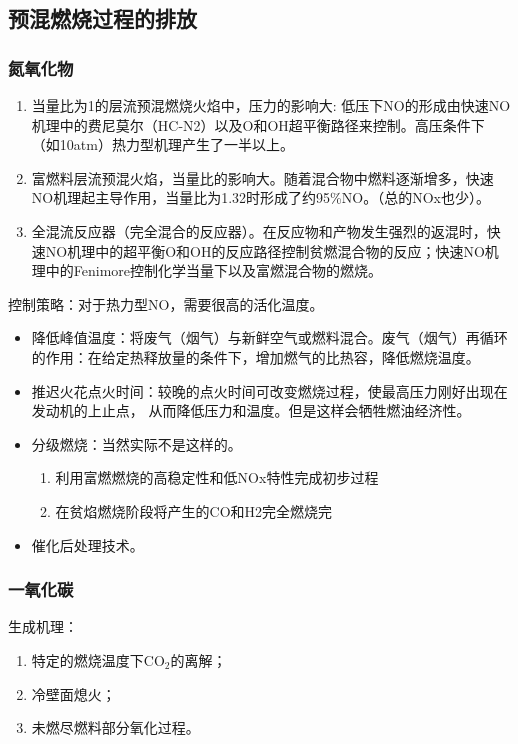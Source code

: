 \subsection{预混燃烧过程的排放}

\subsubsection{氮氧化物}

\begin{enumerate}
    \item 当量比为1的层流预混燃烧火焰中，压力的影响大: 低压下NO的形成由快速NO机理中的费尼莫尔（HC-N2）以及O和OH超平衡路径来控制。高压条件下（如10atm）热力型机理产生了一半以上。
    \item 富燃料层流预混火焰，当量比的影响大。随着混合物中燃料逐渐增多，快速NO机理起主导作用，当量比为1.32时形成了约95\%NO。（总的NOx也少）。
    \item 全混流反应器（完全混合的反应器）。在反应物和产物发生强烈的返混时，快速NO机理中的超平衡O和OH的反应路径控制贫燃混合物的反应；快速NO机理中的Fenimore控制化学当量下以及富燃混合物的燃烧。
\end{enumerate}

控制策略：对于热力型NO，需要很高的活化温度。
\begin{itemize}
    \item 降低峰值温度：将废气（烟气）与新鲜空气或燃料混合。废气（烟气）再循环的作用：在给定热释放量的条件下，增加燃气的比热容，降低燃烧温度。
    \item 推迟火花点火时间：较晚的点火时间可改变燃烧过程，使最高压力刚好出现在发动机的上止点， 从而降低压力和温度。但是这样会牺牲燃油经济性。
    \item 分级燃烧：当然实际不是这样的。
    \begin{enumerate}
        \item 利用富燃燃烧的高稳定性和低NOx特性完成初步过程
        \item 在贫焰燃烧阶段将产生的CO和H2完全燃烧完
    \end{enumerate}
    \item 催化后处理技术。
\end{itemize}

\subsubsection{一氧化碳}
生成机理：
\begin{enumerate}
    \item 特定的燃烧温度下CO\(_2\)的离解；
    \item 冷壁面熄火；
    \item 未燃尽燃料部分氧化过程。
\end{enumerate}

